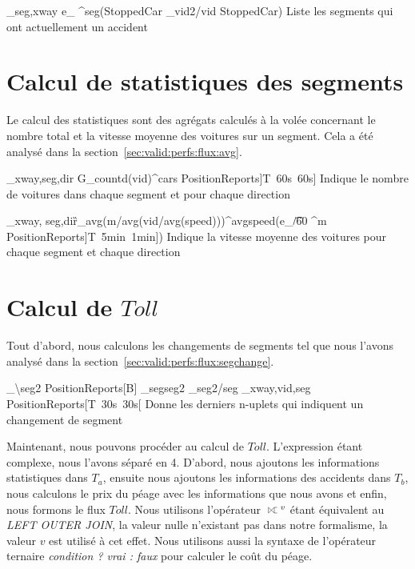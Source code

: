 	{\Pi_{seg,xway} e_{\left\lfloor {} \right\rfloor}^{seg}(StoppedCar \Join \rho_{vid2/vid} StoppedCar)}
	{Liste les segments qui ont actuellement un accident}

\section{Calcul de statistiques des segments}
Le calcul des statistiques sont des agrégats calculés à la volée concernant le nombre total et la vitesse moyenne des voitures sur un segment. Cela a été analysé dans la section~\ref{sec:valid:perfs:flux:avg}.

	{\null_{xway,seg,dir} G_{countd(vid)}^{cars} PositionReports]T\ 60s\ 60s]}
	{Indique le nombre de voitures dans chaque segment et pour chaque direction}

	{\null_{xway, seg,dir}\G_{avg(m/avg(vid/avg(speed)))}^{avgspeed}(e_{\lfloor \t/60 \rfloor}^{m} PositionReports]T\ 5min\ 1min])}
	{Indique la vitesse moyenne des voitures pour chaque segment et chaque direction}

\section{Calcul de $Toll$}
Tout d'abord, nous calculons les changements de segments tel que nous l'avons analysé dans la section~\ref{sec:valid:perfs:flux:segchange}.

	{\Pi_{\backslash seg2} PositionReports[B] \mathop{\Join}_{seg\neq seg2} \rho_{seg2/seg} \Pi_{xway,vid,seg} PositionReports[T\ 30s\ 30s[}
	{Donne les derniers n-uplets qui indiquent un changement de segment}

Maintenant, nous pouvons procéder au calcul de $Toll$. L'expression étant complexe, nous l'avons séparé en 4. D'abord, nous ajoutons les informations statistiques dans $T_a$, ensuite nous ajoutons les informations des accidents dans $T_b$, nous calculons le prix du péage avec les informations que nous avons et enfin, nous formons le flux $Toll$. Nous utilisons l'opérateur $\lojoin^v$ étant équivalent au \textit{LEFT OUTER JOIN}, la valeur nulle n'existant pas dans notre formalisme, la valeur $v$ est utilisé à cet effet. Nous utilisons aussi la syntaxe de l'opérateur ternaire \textit{condition ? vrai : faux} pour calculer le coût du péage.


